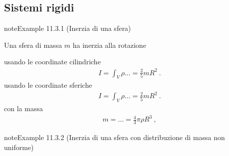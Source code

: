 \documentclass[letterpaper,10pt,italian]{jupyterBook}
\begin{document}
\subsection{Sistemi rigidi}
\label{\detokenize{ch/mechanics/inertia-continuum:sistemi-rigidi}}\label{\detokenize{ch/mechanics/inertia-continuum:physics-hs-mechanics-inertia-continuum-rigid}}\label{ch/mechanics/inertia-continuum:inertia-sphere}
\begin{sphinxadmonition}{note}{Example 11.3.1 (Inerzia di una sfera)}



\sphinxAtStartPar
Una sfera di massa \(m\) ha inerzia alla rotazione

\sphinxAtStartPar
usando le coordinate cilindriche
\begin{equation*}
\begin{split}I = \int_V \rho \dots = \frac{2}{5} m R^2 \ . \end{split}
\end{equation*}
\sphinxAtStartPar
usando le coordinate sferiche
\begin{equation*}
\begin{split}I = \int_V \rho \dots = \frac{2}{5} m R^2 \ . \end{split}
\end{equation*}
\sphinxAtStartPar
con la massa
\begin{equation*}
\begin{split}m = \dots = \frac{4}{3} \pi \rho R^3 \ ,\end{split}
\end{equation*}\end{sphinxadmonition}
\label{ch/mechanics/inertia-continuum:inertia-sphere-non-uniform}
\begin{sphinxadmonition}{note}{Example 11.3.2 (Inerzia di una sfera con distribuzione di massa non uniforme)}


\end{sphinxadmonition}
\label{ch/mechanics/inertia-continuum:inertia-disk}
\end{document}
